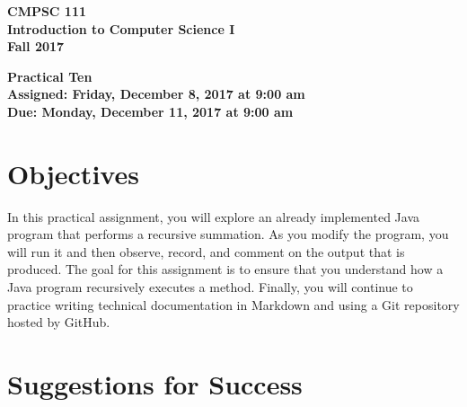 \documentclass[11pt]{article}
\newcommand{\assignmentduedate}{December 11}
\newcommand{\assignmentassignedate}{December 8}
\newcommand{\assignmentnumber}{Ten}
\newcommand{\labyear}{2017}
\newcommand{\labdueday}{Monday}
\newcommand{\labassignday}{Friday}
\newcommand{\labtime}{9:00 am}
\newcommand{\assigneddate}{Assigned: \labassignday, \assignmentassignedate, \labyear{} at \labtime{}}
\newcommand{\duedate}{Due: \labdueday, \assignmentduedate, \labyear{} at \labtime{}}
\newcommand{\labtitle}[1]
{
  \begin{center}
    \begin{center}
      \bf
      CMPSC 111\\Introduction to Computer Science I\\
      Fall 2017\\
      \medskip
    \end{center}
    \bf
    #1
  \end{center}
}
\begin{document}
\thispagestyle{empty}

\labtitle{Practical \assignmentnumber{} \\ \assigneddate{} \\ \duedate{}}

\section*{Objectives}

In this practical assignment, you will explore an already implemented Java
program that performs a recursive summation. As you modify the program, you will
run it and then observe, record, and comment on the output that is produced. The
goal for this assignment is to ensure that you understand how a Java program
recursively executes a method. Finally, you will continue to practice writing
technical documentation in Markdown and using a Git repository hosted by GitHub.

\section*{Suggestions for Success}
\end{document}
